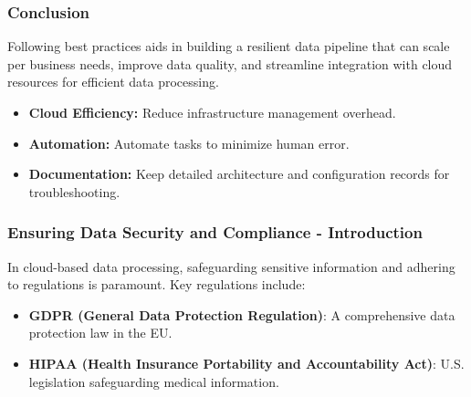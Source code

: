\documentclass{beamer}
\begin{document}
\begin{frame}
    \frametitle{Conclusion}
    Following best practices aids in building a resilient data pipeline that can scale per business needs, improve data quality, and streamline integration with cloud resources for efficient data processing.
    
    \begin{itemize}
        \item \textbf{Cloud Efficiency:} Reduce infrastructure management overhead.
        \item \textbf{Automation:} Automate tasks to minimize human error.
        \item \textbf{Documentation:} Keep detailed architecture and configuration records for troubleshooting.
    \end{itemize}
\end{frame}

\begin{frame}[fragile]
    \frametitle{Ensuring Data Security and Compliance - Introduction}
    In cloud-based data processing, safeguarding sensitive information and adhering to regulations is paramount. Key regulations include:
    \begin{itemize}
        \item \textbf{GDPR (General Data Protection Regulation)}: A comprehensive data protection law in the EU.
        \item \textbf{HIPAA (Health Insurance Portability and Accountability Act)}: U.S. legislation safeguarding medical information.
    \end{itemize}
\end{frame}
\end{document}
